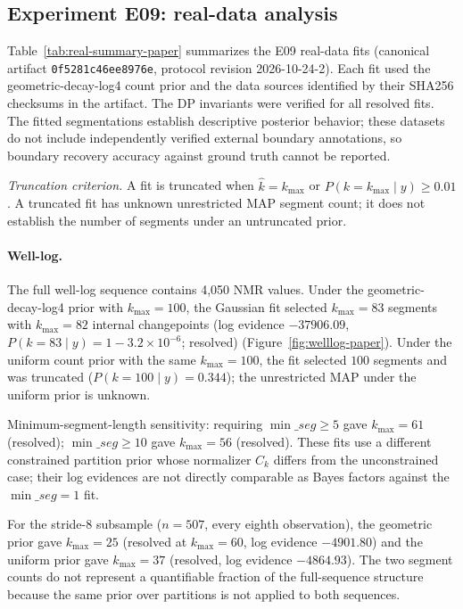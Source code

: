 



\FloatBarrier
\subsection{Experiment E09: real-data analysis}
\label{sec:e09}
Table~\ref{tab:real-summary-paper} summarizes the E09 real-data fits (canonical artifact \texttt{0f5281c46ee8976e}, protocol revision 2026-10-24-2). Each fit used the geometric-decay-log4 count prior and the data sources identified by their SHA256 checksums in the artifact. The DP invariants were verified for all resolved fits. The fitted segmentations establish descriptive posterior behavior; these datasets do not include independently verified external boundary annotations, so boundary recovery accuracy against ground truth cannot be reported.

\textit{Truncation criterion.} A fit is truncated when $\hat k = k_{\max}$ or $P(k = k_{\max} \mid y) \geq 0.01$. A truncated fit has unknown unrestricted MAP segment count; it does not establish the number of segments under an untruncated prior.



\paragraph{Well-log.}
The full well-log sequence contains 4,050 NMR values. Under the geometric-decay-log4 prior with $k_{\max}=100$, the Gaussian fit selected $k_{\max}=83$ segments with $k_{\max}=82$ internal changepoints (log evidence $-37906.09$, $P(k=83 \mid y) = 1 - 3.2 \times 10^{-6}$; resolved) (Figure~\ref{fig:welllog-paper}). Under the uniform count prior with the same $k_{\max}=100$, the fit selected $100$ segments and was truncated ($P(k=100 \mid y) = 0.344$); the unrestricted MAP under the uniform prior is unknown.

Minimum-segment-length sensitivity: requiring $\min\_seg \geq 5$ gave $k_{\max}=61$ (resolved); $\min\_seg \geq 10$ gave $k_{\max}=56$ (resolved). These fits use a different constrained partition prior whose normalizer $C_k$ differs from the unconstrained case; their log evidences are not directly comparable as Bayes factors against the $\min\_seg=1$ fit.

For the stride-8 subsample ($n=507$, every eighth observation), the geometric prior gave $k_{\max}=25$ (resolved at $k_{\max}=60$, log evidence $-4901.80$) and the uniform prior gave $k_{\max}=37$ (resolved, log evidence $-4864.93$). The two segment counts do not represent a quantifiable fraction of the full-sequence structure because the same prior over partitions is not applied to both sequences.

